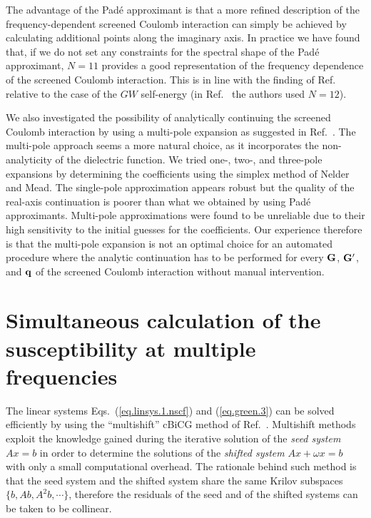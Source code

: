 \documentclass[twocolumn,prb,showpacs,superscriptaddress]{revtex4}
\def\w{\omega}
\def\q{{\bf q}}
\def\G{{\bf G}}
\def\Gp{{\bf G^\prime}}
\begin{document}
The advantage of the Pad\'e approximant is that a more refined description
of the frequency-dependent screened Coulomb interaction can simply be achieved
by calculating additional points along the imaginary axis. In practice
we have found that, if we do not set any constraints for the spectral
shape of the Pad\'e approximant, $N=11$ provides a good representation of the frequency
dependence of the screened Coulomb interaction. This is in line with the finding 
of Ref.\  relative to the case of the $GW$ self-energy
(in Ref.\  the authors used $N=12$). 

We also investigated the possibility of analytically continuing
the screened Coulomb interaction by using a multi-pole expansion
as suggested in Ref.\ . The multi-pole approach
seems a more natural choice, as it incorporates the non-analyticity
of the dielectric function. We tried one-, two-, and three-pole
expansions by determining the coefficients using the simplex 
method of Nelder and Mead.\cite{nelder-mead}
The single-pole approximation appears robust but the quality
of the real-axis continuation is poorer than what we obtained
by using Pad\'e approximants. Multi-pole approximations were found
to be unreliable due to their high sensitivity to the initial guesses 
for the coefficients.
Our experience therefore is that the multi-pole expansion is not an optimal 
choice for an automated procedure where the analytic continuation has to be
performed for every $\G$, $\Gp$, and $\q$ of the screened Coulomb 
interaction without manual intervention. 

\section{Simultaneous calculation of the susceptibility at multiple frequencies}\label{app.multishift}

The linear systems Eqs.\ (\ref{eq.linsys.1.nscf}) and (\ref{eq.green.3})
can be solved efficiently by using the ``multishift'' 
cBiCG method of Ref.~.
Multishift methods exploit the knowledge gained during the iterative
solution of the {\it seed system} $Ax=b$ in order to determine the solutions 
of the {\it shifted system} $Ax+\w x=b$ with only a small computational overhead.
The rationale behind such method is that the seed system and the
shifted system share the same Krilov subspaces $\{b,Ab,A^2b,\cdots\}$,
therefore the residuals of the seed and of the shifted
systems can be taken to be collinear.\cite{frommer}
\end{document}
